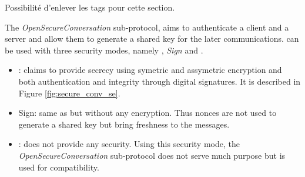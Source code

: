 \newcommand{\gereq}{GEReq}
\newcommand{\geres}{GERes}
\newcommand{\oscreq}{OSCReq}
\newcommand{\oscres}{OSCRes}

\TODO Possibilité d'enlever les tags pour cette section.

The {\em OpenSecureConversation} sub-protocol, aims to authenticate a client and
a server and allow them to generate a shared key for the later communications.
\opcua can be used with three security modes, namely {\em \smn}, {\em Sign} and
{\em \smse}.

\begin{itemize}
    \item \smse: claims to provide secrecy using symetric and
    assymetric encryption and both authentication and integrity through digital
    signatures.
    It is described in Figure \ref{fig:secure_conv_se}.

    \item Sign: same as {\em \smse} but without any encryption.
    Thus nonces are not used to generate a shared key but bring freshness to the
    messages.

    \item \smn: does not provide any security.
    Using this security mode, the {\em OpenSecureConversation} sub-protocol does
    not serve much purpose but is used for compatibility.
\end{itemize}

